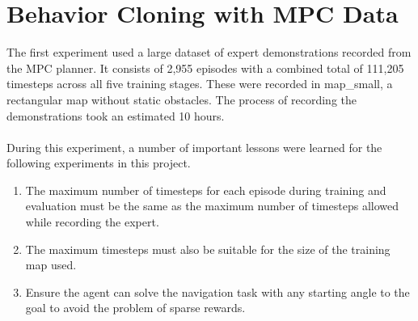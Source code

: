 \section{Behavior Cloning with MPC Data}
The first experiment used a large dataset of expert demonstrations recorded from the MPC planner. It consists of 2,955 episodes with a combined total of 111,205 timesteps across all five training stages. These were recorded in map\_small, a rectangular map without static obstacles. The process of recording the demonstrations took an estimated 10 hours.
\\\\
\noindent During this experiment, a number of important lessons were learned for the following experiments in this project. 
\begin{enumerate}
    \item The maximum number of timesteps for each episode during training and evaluation must be the same as the maximum number of timesteps allowed while recording the expert.
    \item The maximum timesteps must also be suitable for the size of the training map used.
    \item Ensure the agent can solve the navigation task with any starting angle to the goal to avoid the problem of sparse rewards.
\end{enumerate}
